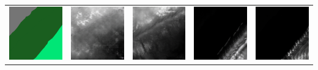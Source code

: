 \documentclass[twocolumn]{article}
\begin{document}
\begin{table}[t]
\begin{tabular}{c|c|c|c|c}
 				\includegraphics[width=0.25\columnwidth]{20.png} & \includegraphics[width=0.25\columnwidth]{21.png} & \includegraphics[width=0.25\columnwidth]{22.png} & \includegraphics[width=0.25\columnwidth]{23.png} & \includegraphics[width=0.25\columnwidth]{24.png} \\

\end{tabular}
\end{table}
\end{document}
